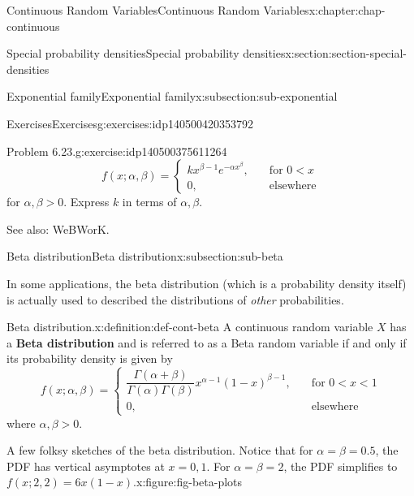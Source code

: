 \documentclass[oneside,10pt,]{book}
\newcommand{\terminology}[1]{\textbf{#1}}
\newcommand{\lt}{<}
\newcommand{\gt}{>}
\newcommand{\amp}{&}
\begin{document}
\begin{chapterptx}{Continuous Random Variables}{}{Continuous Random Variables}{}{}{x:chapter:chap-continuous}
\begin{sectionptx}{Special probability densities}{}{Special probability densities}{}{}{x:section:section-special-densities}
\begin{subsectionptx}{Exponential family}{}{Exponential family}{}{}{x:subsection:sub-exponential}
\begin{exercises-subsubsection}{Exercises}{}{Exercises}{}{}{g:exercises:idp140500420353792}
\begin{divisionexercise}{2}{Problem 6.23.}{}{g:exercise:idp140500375611264}
\begin{equation*}
f(x; \alpha, \beta) =
\begin{cases}kx^{\beta-1}e^{-\alpha x^\beta}, \amp \quad
\text{
for }0 \lt x\\0, \amp \quad \text{elsewhere}\end{cases}
\end{equation*}
for \(\alpha, \beta \gt 0\).  Express \(k\) in terms of \(\alpha,
\beta\).%
\end{divisionexercise}%
See also: WeBWorK.%
\end{exercises-subsubsection}
\end{subsectionptx}
%
%
\typeout{************************************************}
\typeout{************************************************}
%
\begin{subsectionptx}{Beta distribution}{}{Beta distribution}{}{}{x:subsection:sub-beta}
\begin{introduction}{}%
In some applications, the beta distribution (which is a probability density itself) is actually used to described the distributions of \emph{other} probabilities.%
\end{introduction}%
\begin{definition}{Beta distribution.}{x:definition:def-cont-beta}%
A continuous random variable \(\displaystyle X\) has a \terminology{Beta distribution} and is referred to as a Beta random variable if and only if its probability density is given by%
\begin{equation*}
f(x; \alpha, \beta) =
\begin{cases}\dfrac{\Gamma(\alpha+\beta)}{\Gamma(\alpha)\Gamma(\beta)}x^
{\alpha-1}(1-x)^{\beta-1}, \amp \quad \text{
for }0 \lt x \lt 1\\0, \amp \quad \text{elsewhere}\end{cases}
\end{equation*}
where \(\alpha, \beta \gt 0\).%
\end{definition}
\begin{figureptx}{A few folksy sketches of the beta distribution. Notice that for \(\alpha = \beta = 0.5\), the PDF has vertical asymptotes at \(x =
0, 1\). For \(\alpha = \beta = 2\), the PDF simplifies to \(f(x; 2, 2) =
6x(1-x)\).}{x:figure:fig-beta-plots}{}%
\begin{image}{0.25}{0.5}{0.25}%

\end{image}
\end{figureptx}
\end{subsectionptx}
\end{sectionptx}
\end{chapterptx}
\end{document}
